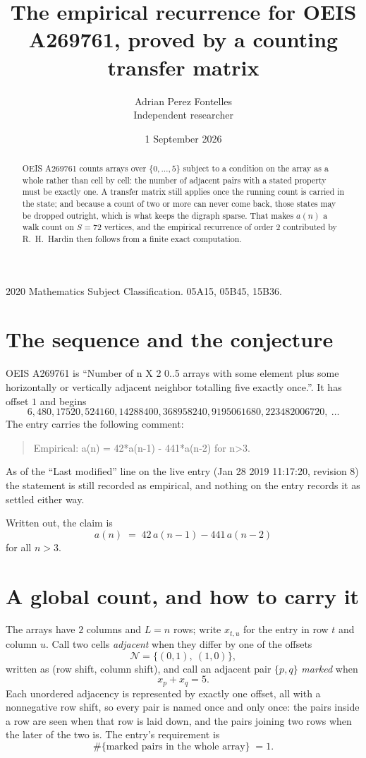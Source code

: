 \documentclass[11pt,a4paper]{article}
\title{The empirical recurrence for OEIS A269761, proved by a counting transfer matrix}
\author{Adrian Perez Fontelles\\ \small Independent researcher}
\date{1 September 2026}
\theoremstyle{plain}
\theoremstyle{definition}
\begin{document}
\maketitle

\begin{abstract}
OEIS A269761 counts arrays over $\{0,\dots,5\}$ subject to a condition on the array as a
whole rather than cell by cell: the number of adjacent pairs with a stated property must be
exactly one. A transfer matrix still applies once the running count is carried in the state; and
because a count of two or more can never come back, those states may be dropped outright,
which is what keeps the digraph sparse. That makes $a(n)$ a walk count on $S=72$ vertices,
and the empirical recurrence of order $2$ contributed by R.~H.~Hardin then follows from
a finite exact computation.
\end{abstract}

\noindent\small 2020 Mathematics Subject Classification. 05A15, 05B45, 15B36.\normalsize

\section{The sequence and the conjecture}

OEIS A269761 is ``Number of n X 2 0..5 arrays with some element plus some horizontally or vertically adjacent neighbor totalling five exactly once.''. It has offset $1$ and begins
\[
6, 480, 17520, 524160, 14288400, 368958240, 9195061680, 223482006720,\ \dots
\]
The entry carries the following comment:
\begin{quote}\small
Empirical: a(n) = 42*a(n-1) - 441*a(n-2) for n>3.
\end{quote}
As of the ``Last modified'' line on the live entry (Jan 28 2019 11:17:20, revision 8) the statement is
still recorded as empirical, and nothing on the entry records it as settled either way.

Written out, the claim is
\begin{equation}\label{eq:conj}
a(n)\;=\;42\,a(n-1) - 441\,a(n-2)
\end{equation}
for all $n>3$.

\section{A global count, and how to carry it}

The arrays have $2$ columns and $L=n$ rows; write $x_{t,u}$ for the entry in
row $t$ and column $u$. Call two cells \emph{adjacent} when they differ by one of the
offsets
\[
\mathcal N=\{(0,1),\ (1,0)\},
\]
written as (row shift, column shift), and call an adjacent pair $\{p,q\}$
\emph{marked} when
\[
x_{p}+x_{q}=5 .
\]
Each unordered adjacency is represented by exactly one offset, all with a nonnegative row
shift, so every pair is named once and only once: the pairs inside a row are seen when
that row is laid down, and the pairs joining two rows when the later of the two is. The
entry's requirement is
\begin{equation}\label{eq:glob}
\#\{\text{marked pairs in the whole array}\}\;=1.
\end{equation}
\end{document}
